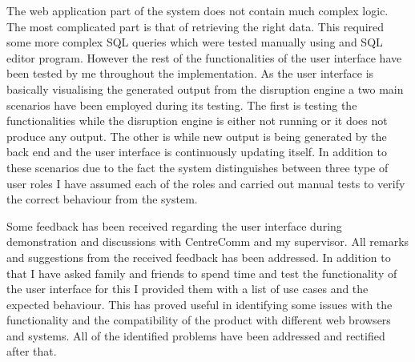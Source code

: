 The web application part of the system does not contain much complex logic. The most complicated part is that of retrieving the right data. This required some more complex SQL queries which were tested manually using and SQL editor program. However the rest of the functionalities of the user interface have been tested by me throughout the implementation. As the user interface is basically visualising the generated output from the disruption engine a two main scenarios have been employed during its testing. The first is testing the functionalities while the disruption engine is either not running or it does not produce any output. The other is while new output is being generated by the back end and the user interface is continuously updating itself. In addition to these scenarios due to the fact the system distinguishes between three type of user roles I have assumed each of the roles and carried out manual tests to verify the correct behaviour from the system. 

Some feedback has been received regarding the user interface during demonstration and discussions with CentreComm and my supervisor. All remarks and suggestions from the received feedback has been addressed. In addition to that I have asked family and friends to spend time and test the functionality of the user interface for this I provided them with a list of use cases and the expected behaviour. This has proved useful in identifying some issues with the functionality and the compatibility of the product with different web browsers and systems. All of the identified problems have been addressed and rectified after that.



